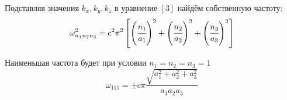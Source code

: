 Подставляя значения \( k_x, k_y, k_z \) в уравнение \( [3] \) 
найдём собственную частоту:
\[
	\omega^2_{n_1 n_2 n_3} = c^2 \pi^2 \left[ 
		\left( \cfrac{n_1}{a_1} \right)^2 + 
		\left( \cfrac{n_2}{a_2} \right)^2 + 
		\left( \cfrac{n_3}{a_3} \right)^2 \right]
\]

Наименьшая частота будет при условии \( n_1 = n_2 = n_3 = 1 \)
\[
	\omega_{111} = \pm c\pi
		\frac{\sqrt{a^2_1 + a^2_2 + a^2_3}}{a_1 a_2 a_3}
\]


